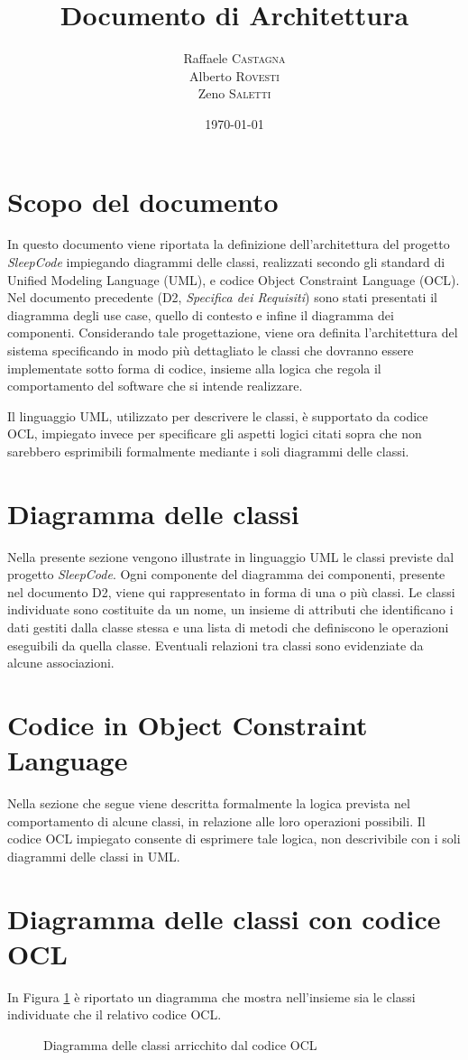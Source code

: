 \documentclass[11pt, a4paper]{article}
\title{Documento di Architettura}
\author{Raffaele \textsc{Castagna}\\
Alberto \textsc{Rovesti}\\
Zeno \textsc{Saletti}}
\date{\today}
\theoremstyle{definition} %
\begin{document}


\tableofcontents

\newpage

\section*{Scopo del documento}
In questo documento viene riportata la definizione dell'architettura del
progetto \textit{SleepCode} impiegando diagrammi delle classi, realizzati
secondo gli standard di Unified Modeling Language (UML), e codice Object
Constraint Language (OCL). Nel documento precedente (D2, \textit{Specifica
dei Requisiti}) sono stati presentati il diagramma degli use case, quello
di contesto e infine il diagramma dei componenti. Considerando tale
progettazione, viene ora definita l'architettura del sistema specificando
in modo più dettagliato le classi che dovranno essere implementate sotto forma di
codice, insieme alla logica che regola il comportamento del software che
si intende realizzare.

Il linguaggio UML, utilizzato per descrivere le classi, è supportato da
codice OCL, impiegato invece per specificare gli aspetti logici citati sopra
che non sarebbero esprimibili formalmente mediante i soli diagrammi delle
classi.


\newpage
\section{Diagramma delle classi}
Nella presente sezione vengono illustrate in linguaggio UML le classi
previste dal progetto \textit{SleepCode}. Ogni componente del diagramma
dei componenti, presente nel documento D2, viene qui rappresentato
in forma di una o più classi. Le classi individuate sono costituite
da un nome, un insieme di attributi che identificano i dati gestiti dalla
classe stessa e una lista di metodi che definiscono le operazioni
eseguibili da quella classe. Eventuali relazioni tra classi sono evidenziate
da alcune associazioni.


\section{Codice in Object Constraint Language}
Nella sezione che segue viene descritta formalmente la logica prevista
nel comportamento di alcune classi, in relazione alle loro operazioni
possibili. Il codice OCL impiegato consente di esprimere tale logica,
non descrivibile con i soli diagrammi delle classi in UML.


\section{Diagramma delle classi con codice OCL}
In Figura \ref{umlocl} è riportato un diagramma che mostra nell'insieme
sia le classi individuate che il relativo codice OCL.

\begin{figure}[H]
\centering
\caption{Diagramma delle classi arricchito dal codice OCL}
\label{umlocl}
\end{figure}
\end{document}
